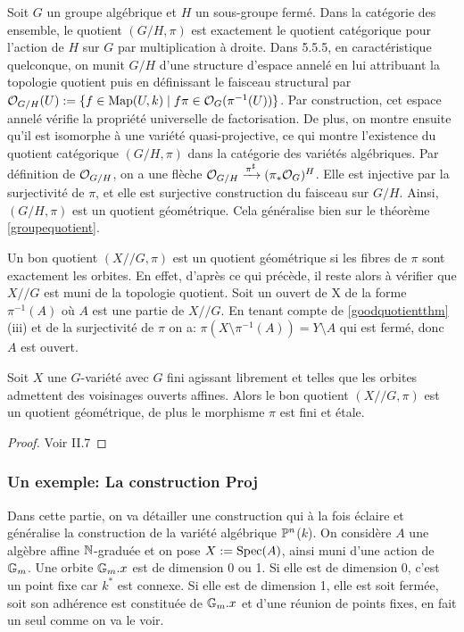 \begin{ex}\label{groupQuotientGeometrique}
Soit $G$ un groupe algébrique et $H$ un sous-groupe fermé. Dans la catégorie des ensemble, le quotient $(G/H,\pi)$ est exactement le quotient catégorique pour l'action de $H$ sur $G$ par multiplication à droite. Dans \cite{LAGSpringer} 5.5.5, en caractéristique quelconque, on munit $G/H$ d'une structure d'espace annelé en lui attribuant la topologie quotient puis en définissant le faisceau structural par $\mathcal{O}_{G/H}(U):=\lbrace f\in\textrm{Map}(U,k)\mid f\pi \in \mathcal{O}_G(\pi^{-1}(U))\rbrace$. Par construction, cet espace annelé vérifie la propriété universelle de factorisation. De plus, on montre ensuite qu'il est isomorphe à une variété quasi-projective, ce qui montre l'existence du quotient catégorique $(G/H,\pi)$ dans la catégorie des variétés algébriques. Par définition de $\mathcal{O}_{G/H}$, on a une flèche $\mathcal{O}_{G/H} \xrightarrow{\pi^\sharp} (\pi_*\mathcal{O}_G)^H$. Elle est injective par la surjectivité de $\pi$, et elle est surjective construction du faisceau sur $G/H$. Ainsi, $(G/H,\pi)$ est un quotient géométrique. Cela généralise bien sur le théorème \ref{groupequotient}.
\end{ex}

\begin{ex}
Un bon quotient $(X//G, \pi)$ est un quotient géométrique si les fibres de $\pi$ sont exactement les orbites. En effet, d'après ce qui précède, il reste alors à vérifier que $X//G$ est muni de la topologie quotient. Soit un ouvert de X de la forme $\pi^{-1}(A)$ où $A$ est une partie de $X//G$. En tenant compte de \ref{goodquotientthm} (iii) et de la surjectivité de $\pi$ on a: $\pi(X\setminus \pi^{-1}(A))=Y\setminus A$ qui est fermé, donc $A$ est ouvert.
\end{ex}

\begin{prop}\label{GITEtaleFiniteGroup}
Soit $X$ une $G$-variété avec $G$ fini agissant librement et telles que les orbites admettent des voisinages ouverts affines. Alors le bon quotient $(X//G,\pi)$ est un quotient géométrique, de plus le morphisme $\pi$ est fini et étale.
\end{prop}
\begin{proof}
Voir \cite{MumfordAbelianVarieties} II.7
\end{proof}

\subsubsection{Un exemple: La construction Proj}
\label{ProjConstruction}
Dans cette partie, on va détailler une construction qui à la fois éclaire et généralise la construction de la variété algébrique $\mathbb{P}^n$($k$). On considère $A$ une algèbre affine $\mathbb{N}$-graduée et on pose $X:=\operatorname{Spec}(A)$, ainsi muni d'une action de $\mathbb{G}_m$. Une orbite $\mathbb{G}_m.x$ est de dimension 0 ou 1. Si elle est de dimension 0, c'est un point fixe car $k^*$ est connexe. Si elle est de dimension 1, elle est soit fermée, soit son adhérence est constituée de $\mathbb{G}_m.x$  et d'une réunion de points fixes, en fait un seul comme on va le voir.

